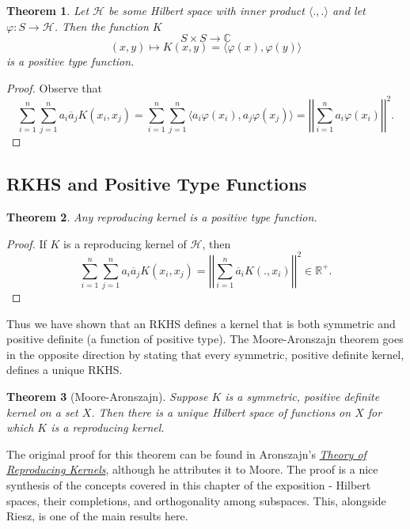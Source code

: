 \documentclass{article}
\newtheorem{thm}{Theorem}[section]
\theoremstyle{definition}
\theoremstyle{remark}
\numberwithin{equation}{section}
\begin{document}
\begin{thm}
Let $\mathcal{H}$ be some Hilbert space with inner product $\langle . , . \rangle$ and let $\varphi : S \rightarrow \mathcal{H}$. Then the function $K$ 
$$S \times S \rightarrow \mathbb{C} $$
$$(x,y) \mapsto K(x,y) = \langle \varphi (x), \varphi (y) \rangle $$
is a positive type function. 
\end{thm}

\begin{proof}
Observe that 
$$\sum _{i= 1} ^n \sum _{j = 1} ^n a_i \overline{a}_j K(x_i, x_j)  = \sum _{i= 1} ^n \sum _{j = 1} ^n \langle a_i \varphi (x_i), a_j \varphi (x_j) \rangle = \left| \left| \sum _{i = 1} ^n a_i \varphi (x_i) \right| \right|^2.  $$
\end{proof}

\subsection{RKHS and Positive Type Functions}

\begin{thm}
Any reproducing kernel is a positive type function.
\end{thm}
\begin{proof}
If $K$ is a reproducing kernel of $\mathcal{H}$, then 
$$\sum _{i= 1} ^n \sum _{j = 1} ^n a_i \overline{a}_j K(x_i, x_j) = \left| \left| \sum _{i = 1} ^n \overline{a}_i K(., x_i) \right| \right|^2 \in \mathbb{R}^+. $$
\end{proof}

Thus we have shown that an RKHS defines a kernel that is both symmetric and positive definite (a function of positive type). The Moore-Aronszajn theorem goes in the opposite direction by stating that every symmetric, positive definite kernel, defines a unique RKHS. 

\begin{thm}[Moore-Aronszajn]
Suppose $K$ is a symmetric, positive definite kernel on a set $X$. Then there is a unique Hilbert space of functions on $X$ for which $K$ is a reproducing kernel. 
\end{thm}

The original proof for this theorem can be found in Aronszajn's \href{https://www.ams.org/journals/tran/1950-068-03/S0002-9947-1950-0051437-7/S0002-9947-1950-0051437-7.pdf}{\textit{Theory of Reproducing Kernels}}, although he attributes it to Moore. The proof is a nice synthesis of the concepts covered in this chapter of the exposition - Hilbert spaces, their completions, and orthogonality among subspaces. This, alongside Riesz, is one of the main results here. 
\end{document}

